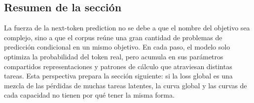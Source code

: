 \subsection{Resumen de la sección}

La fuerza de la next-token prediction no se debe a que el nombre del objetivo sea complejo, sino a que el corpus reúne una gran cantidad de problemas de predicción condicional en un mismo objetivo. En cada paso, el modelo solo optimiza la probabilidad del token real, pero acumula en sus parámetros compartidos representaciones y patrones de cálculo que atraviesan distintas tareas. Esta perspectiva prepara la sección siguiente: si la loss global es una mezcla de las pérdidas de muchas tareas latentes, la curva global y las curvas de cada capacidad no tienen por qué tener la misma forma.
